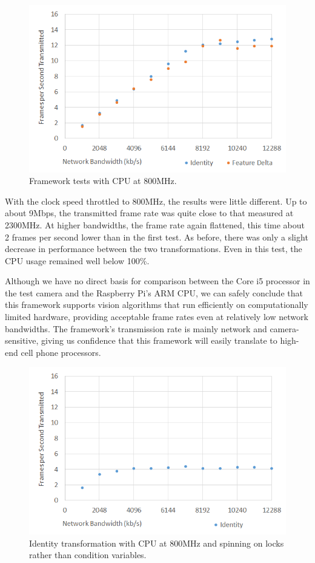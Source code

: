 \begin{figure}
\includegraphics[width=\columnwidth]{figure4.png}
\caption{Framework tests with CPU at 800MHz.}
\end{figure}

With the clock speed throttled to 800MHz, the results were little different.  Up to about
9Mbps, the transmitted frame rate was quite close to that measured at 2300MHz.  At
higher bandwidths, the frame rate again flattened, this time about 2 frames per second
lower than in the first test.  As before, there was only a slight decrease in performance
between the two transformations.  Even in this test, the CPU usage remained well
below 100\%.

Although we have no direct basis for comparison between the Core i5 processor in the
test camera and the Raspberry Pi's ARM CPU, we can safely conclude that this framework
supports vision algorithms that run efficiently on computationally limited hardware, providing
acceptable frame rates even at relatively low network bandwidths.  The framework's transmission rate
is mainly network and camera-sensitive, giving us confidence that
this framework  will easily translate to high-end cell phone processors.

\begin{figure}
\includegraphics[width=\columnwidth]{figure5.png}
\caption{Identity transformation with CPU at 800MHz and spinning on locks rather than condition variables.}
\end{figure}

